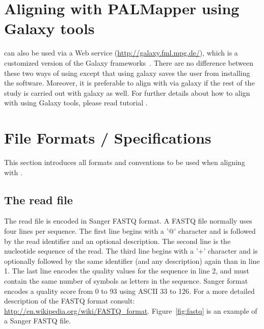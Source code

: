 \documentclass{article}
\begin{document}
\section{Aligning with PALMapper using Galaxy tools}
\label{sec:aligninggal}
\PALMapper{} can also be used via a Web service
(\url{http://galaxy.fml.mpg.de/}), which is a customized version of
the Galaxy frameworks~\cite{Galaxy1,Galaxy2,Galaxy3}. There are no
difference between these two ways of using \PALMapper{} except that using
galaxy saves the user from installing the software. Moreover, it is
preferable to align with \PALMapper{} via galaxy if the rest of the study is
carried out with galaxy as well. For further details about how to
align with \PALMapper{} using Galaxy tools, please read \PALMapper{}
tutorial \cite{Palmapper}.



\section{File Formats / Specifications}
\label{sec:formats}
This section introduces all formats and conventions to be used when
aligning with \PALMapper{}.

\subsection{The read file}
\label{sec:readfile}

The read file is encoded in Sanger FASTQ format. A FASTQ file normally
uses four lines per sequence. The first line begins with a '@'
character and is followed by the read identifier and an optional
description. The second line is the nucleotide sequence of the
read. The third line begins with a '+' character and is optionally
followed by the same identifier (and any description) again than in
line 1. The last line encodes the quality values for the sequence in
line 2, and must contain the same number of symbols as letters in the
sequence. Sanger format encodes a quality score from 0 to 93 using ASCII
33 to 126. For a more detailed description of the FASTQ format consult:
\url{http://en.wikipedia.org/wiki/FASTQ_format}. Figure~\ref{fig:fastq}
is an example of a Sanger FASTQ file.
\end{document}
